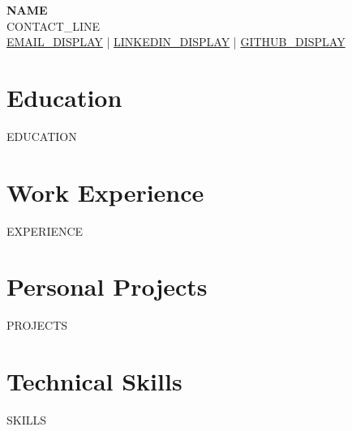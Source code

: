 \documentclass[a4paper,11pt]{article}
\newcommand{\resumeSubHeadingListStart}{\begin{itemize}[leftmargin=0.0in, label={}]}
\newcommand{\resumeSubHeadingListEnd}{\end{itemize}}
\begin{document}
\begin{center}
    {\LARGE\bfseries\scshape {{NAME}}} \\[4pt]
    \small {{CONTACT_LINE}} \\[2pt]
    \small
    \href{mailto:{{EMAIL_URL}}}{{{EMAIL_DISPLAY}}} \quad|\quad
    \href{{{LINKEDIN_URL}}}{{{LINKEDIN_DISPLAY}}} \quad|\quad
    \href{{{GITHUB_URL}}}{{{GITHUB_DISPLAY}}}
\end{center}

\section{Education}
  \resumeSubHeadingListStart
{{EDUCATION}}
  \resumeSubHeadingListEnd

\section{Work Experience}
  \resumeSubHeadingListStart
{{EXPERIENCE}}
  \resumeSubHeadingListEnd

\section{Personal Projects}
  \resumeSubHeadingListStart
{{PROJECTS}}
  \resumeSubHeadingListEnd

\section{Technical Skills}
\vspace{-6pt}
\begin{itemize}[leftmargin=0.15in, label={}]
  \small{\item{
{{SKILLS}}
  }}
\end{itemize}
\end{document}
